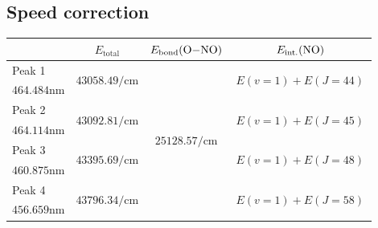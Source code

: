 \documentclass[aspectratio=43,scheme=plain]{ctexbeamer}
\begin{document}
	\subsection{Speed correction}
	\begin{frame}{\insertsubsection}
		\begin{table}[htbp]
			\centering
			\tiny
			\begin{tabularx}{0.9\textwidth}{lccc}
				& $E_\text{total}$ & $E_\text{bond}(\ce{O-NO})$ \footfullcite{ono}& $E_\text{int.}(\ce{NO})$ \\
				\toprule
				Peak 1 & \multirow{2}[2]{*}{$\num{43058.49}\unit{\per \centi \meter}$} & \multirow{8}[8]{*}{$\num{25128.57}\unit{\per \centi \meter}$} & \multirow{2}[2]{*}{\qquad\quad\,\;\;$E (v = 1)+ E( J = 44 )$\qquad\quad\,\;\;} \\
				$\num{464.484}\unit{\nano\meter}$ & & & \\
				\cmidrule{1-2}\cmidrule{4-4}
				Peak 2 & \multirow{2}[2]{*}{$\num{43092.81}\unit{\per \centi \meter}$} & & \multirow{2}[2]{*}{\qquad\quad\,\;\;$E (v = 1)+ E( J = 45 )$\qquad\quad\,\;\;} \\
				$\num{464.114}\unit{\nano\meter}$ & & & \\
				\cmidrule{1-2}\cmidrule{4-4}
				Peak 3 & \multirow{2}[2]{*}{$\num{43395.69}\unit{\per \centi \meter}$} & & \multirow{2}[2]{*}{\qquad\quad\,\;\;$E (v = 1)+ E( J = 48 )$\qquad\quad\,\;\;} \\
				$\num{460.875}\unit{\nano\meter}$ & & & \\
				\cmidrule{1-2}\cmidrule{4-4}
				Peak 4 & \multirow{2}[2]{*}{$\num{43796.34}\unit{\per \centi \meter}$} & & \multirow{2}[2]{*}{\qquad\quad\,\;\;$E (v = 1)+ E( J = 58 )$\qquad\quad\,\;\;} \\
				$\num{456.659}\unit{\nano\meter}$ & & & \\
				\bottomrule
			\end{tabularx}
		\end{table}
	\end{frame}
\end{document}
